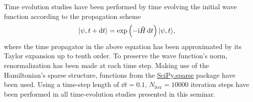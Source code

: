\documentclass[10pt,a4paper]{article}
\begin{document}
Time evolution studies have been performed by time evolving the initial wave function according to the propagation scheme
\begin{equation}\label{eq:propagation}
\vert\psi, t+\mathrm{d}t\rangle=\exp\left(-\mathrm{i}\hat{H}\,\mathrm{d} t\right)\vert\psi, t\rangle,
\end{equation}
where the time propagator in the above equation has been approximated by its Taylor expansion up to tenth order. To preserve the wave function's norm, renormalization has been made at each time step. Making use of the Hamiltonian's sparse structure, functions from the \url{SciPy.sparse} package have been used. Using a time-step length of $\dd t=0.1$, $N_\mathrm{iter}=10000$ iteration steps have been performed in all time-evolution studies presented in this seminar.   


\end{document}
